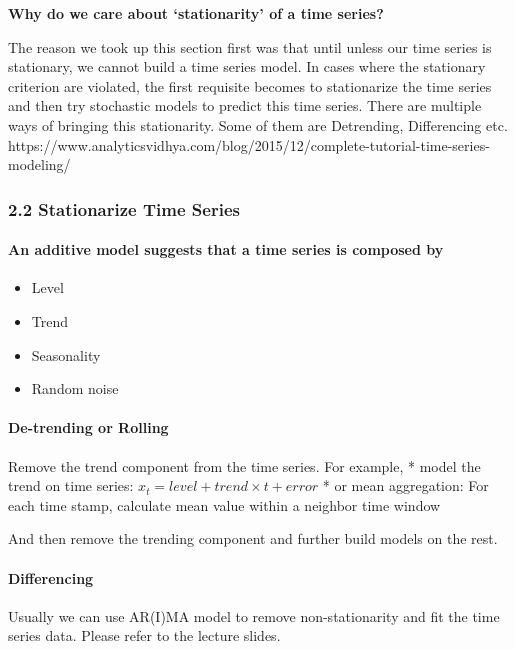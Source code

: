 \documentclass[11pt]{article}
\providecommand{\tightlist}{%
      \setlength{\itemsep}{0pt}\setlength{\parskip}{0pt}}
\begin{document}
\textbf{Why do we care about `stationarity' of a time series?}

The reason we took up this section first was that until unless our time
series is stationary, we cannot build a time series model. In cases
where the stationary criterion are violated, the first requisite becomes
to stationarize the time series and then try stochastic models to
predict this time series. There are multiple ways of bringing this
stationarity. Some of them are Detrending, Differencing etc.
https://www.analyticsvidhya.com/blog/2015/12/complete-tutorial-time-series-modeling/

    \subsubsection{2.2 Stationarize Time
Series}\label{stationarize-time-series}

\paragraph{An additive model suggests that a time series is composed
by}\label{an-additive-model-suggests-that-a-time-series-is-composed-by}

\begin{itemize}
\tightlist
\item
  Level
\item
  Trend
\item
  Seasonality
\item
  Random noise 
\end{itemize}

\paragraph{De-trending or Rolling}\label{de-trending-or-rolling}

Remove the trend component from the time series. For example, * model
the trend on time series: \(x_t=level+trend\times t+error\) * or mean
aggregation: For each time stamp, calculate mean value within a neighbor
time window

And then remove the trending component and further build models on the
rest.

\paragraph{Differencing}\label{differencing}

Usually we can use AR(I)MA model to remove non-stationarity and fit the
time series data. Please refer to the lecture slides.
\end{document}
